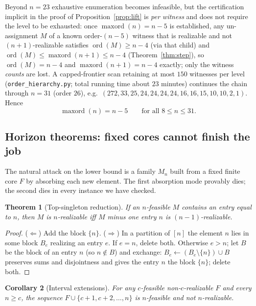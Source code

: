 \documentclass[11pt]{article}
\newtheorem{theorem}{Theorem}[section]
\newtheorem{corollary}[theorem]{Corollary}
\theoremstyle{definition}
\theoremstyle{remark}
\newcommand{\ord}{\operatorname{ord}}
\newcommand{\maxord}{\operatorname{maxord}}
\newcommand{\intv}[1]{[#1]}
\begin{document}
Beyond $n=23$ exhaustive enumeration becomes infeasible, but the certification
implicit in the proof of Proposition~\ref{prop:lift} is \emph{per witness} and does
not require the level to be exhausted: once $\maxord(n)=n-5$ is established, any
un-assignment $M$ of a known order-$(n{-}5)$ witness that is realizable and not
$(n{+}1)$-realizable satisfies $\ord(M)\ge n-4$ (via that child) and
$\ord(M)\le\maxord(n+1)\le n-4$ (Theorem~\ref{thm:step}), so $\ord(M)=n-4$ and
$\maxord(n+1)=n-4$ exactly; only the witness \emph{counts} are lost. A
capped-frontier scan retaining at most $150$ witnesses per level (\texttt{order\_hierarchy.py};
total running time about $23$ minutes) continues the chain through $n=31$ (order
$26$), e.g.\ $(272,33,25,24,24,24,24,16,16,15,10,10,2,1)$. Hence
\[
\maxord(n)=n-5\qquad\text{for all } 8\le n\le31.
\]

\subsection{Horizon theorems: fixed cores cannot finish the job}\label{subsec:horizon}

The natural attack on the lower bound is a family $M_n$ built from a fixed finite
core $F$ by absorbing each new element. The first absorption mode provably dies;
the second dies in every instance we have checked.

\begin{theorem}[Top-singleton reduction]\label{thm:topsingleton}
If an $n$-feasible $M$ contains an entry equal to $n$, then $M$ is $n$-realizable
iff $M$ minus one entry $n$ is $(n{-}1)$-realizable.
\end{theorem}

\begin{proof}
($\Leftarrow$) Add the block $\{n\}$. ($\Rightarrow$) In a partition of $\intv n$
the element $n$ lies in some block $B_e$ realizing an entry $e$. If $e=n$, delete
both. Otherwise $e>n$; let $B$ be the block of an entry $n$ (so $n\notin B$) and
exchange: $B_e\leftarrow(B_e\setminus\{n\})\cup B$ preserves sums and disjointness
and gives the entry $n$ the block $\{n\}$; delete both.
\end{proof}

\begin{corollary}[Interval extensions]\label{cor:interval}
For any $c$-feasible non-$c$-realizable $F$ and every $n\ge c$, the sequence
$F\cup\{c+1,c+2,\dots,n\}$ is $n$-feasible and not $n$-realizable.
\end{corollary}
\end{document}
